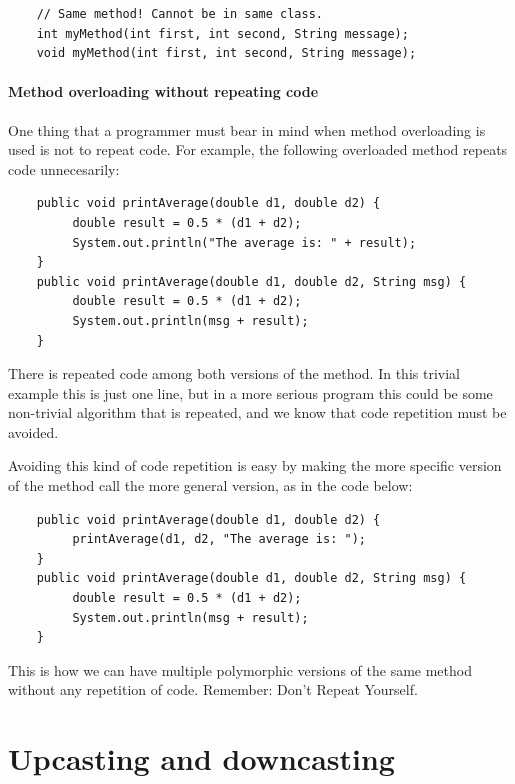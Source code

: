 \begin{verbatim}
    // Same method! Cannot be in same class.
    int myMethod(int first, int second, String message);
    void myMethod(int first, int second, String message);
\end{verbatim}

\paragraph{Method overloading without repeating code}
\label{sec:meth-overl-with}

One thing that a programmer must bear in mind when method overloading
is used is not to repeat code. For example, the following overloaded
method repeats code unnecesarily: 

\begin{verbatim}
    public void printAverage(double d1, double d2) {
         double result = 0.5 * (d1 + d2);
         System.out.println("The average is: " + result);
    }
    public void printAverage(double d1, double d2, String msg) {
         double result = 0.5 * (d1 + d2);
         System.out.println(msg + result);
    }
\end{verbatim}

There is repeated code among both versions of the method. In this
trivial example this is just one line, but in a more serious program
this could be some non-trivial algorithm that is repeated, and we know
that code repetition must be avoided. 

Avoiding this kind of code repetition is easy by making the more
specific version of the method call the more general version, as in
the code below: 

\begin{verbatim}
    public void printAverage(double d1, double d2) {
         printAverage(d1, d2, "The average is: ");
    }
    public void printAverage(double d1, double d2, String msg) {
         double result = 0.5 * (d1 + d2);
         System.out.println(msg + result);
    }
\end{verbatim}

This is how we can have multiple polymorphic versions of the same
method without any repetition of code. Remember: Don't Repeat
Yourself. 

\section{Upcasting and downcasting}
\label{sec:upcasting}

